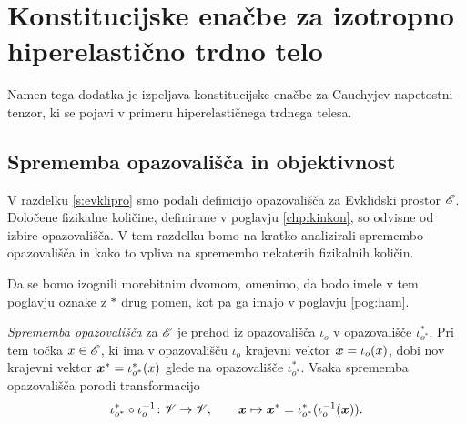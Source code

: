 \appendix

\chapter{Konstitucijske enačbe za izotropno hiperelastično trdno telo}


Namen tega dodatka je izpeljava konstitucijske enačbe za Cauchyjev napetostni tenzor,
ki se pojavi v primeru hiperelastičnega trdnega telesa.


\section{Sprememba opazovališča in objektivnost}


V razdelku \ref{s:evklipro} smo podali definicijo opazovališča za Evklidski
prostor $\mathscr E$. Določene fizikalne količine, definirane v poglavju \ref{chp:kinkon},
so odvisne od izbire opazovališča. V tem razdelku bomo na kratko analizirali spremembo opazovališča
in kako to vpliva na spremembo nekaterih fizikalnih količin.

Da se bomo izognili morebitnim dvomom, omenimo, da bodo imele
v tem poglavju oznake z $*$ drug pomen, kot pa ga imajo v poglavju \ref{pog:ham}.

\emph{Sprememba opazovališča} za $\mathscr E$ je prehod iz opazovališča $\iota_o$ v opazovališče
$\iota^*_{o^*}$. Pri tem točka $x\in\mathscr E$, ki ima v opazovališču $\iota_o$ krajevni vektor
$\boldsymbol x=\iota_o(x)$, dobi nov krajevni vektor $\boldsymbol x^*=\iota^*_{o^*}(x)$ glede na opazovališče
$\iota^*_{o^*}$. Vsaka sprememba opazovališča porodi transformacijo
\[
	\iota^*_{o^*}\circ\iota_o^{-1}\colon\mathscr V\to\mathscr V,\qquad
	\boldsymbol x\mapsto\boldsymbol x^*=\iota^*_{o^*}(\iota_o^{-1}(\boldsymbol x)).
\]

